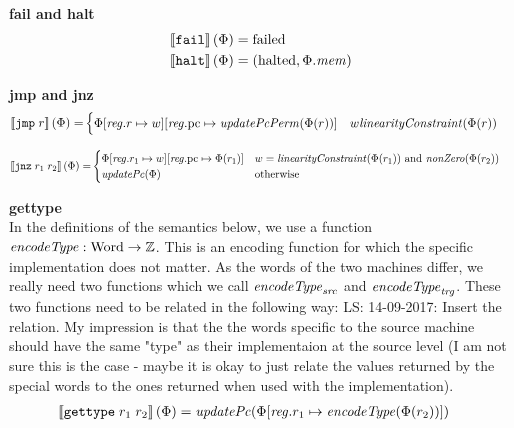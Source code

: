 \documentclass[a4paper]{article}
\newcommand\lau[1]{{\color{purple} \sf \footnotesize {LS: #1}}\\}
\newcommand{\sem}[1]{\left\llbracket #1 \right\rrbracket}
\newcommand{\tand}{\text{ and }}
\newcommand{\totherwise}{\text{otherwise }}
\newcommand{\targetcolor}[1]{\color{black}}
\newcommand{\trg}[1]{{\targetcolor{} #1}}
\newcommand{\zinstr}[1]{\texttt{#1}}
\newcommand{\oneinstr}[2]{
  \ifthenelse{\equal{#2}{}}
  {\zinstr{#1}}
  {\zinstr{#1} \; #2}
}
\newcommand{\twoinstr}[3]{
  \ifthenelse{\equal{#2#3}{}}
  {\zinstr{#1}}
  {\zinstr{#1} \; #2 \; #3}
}
\newcommand{\tfail}{\zinstr{\trg{fail}}}
\newcommand{\thalt}{\zinstr{\trg{halt}}}
\newcommand{\tjmp}[1]{\oneinstr{\trg{jmp}}{#1}}
\newcommand{\tjnz}[2]{\twoinstr{\trg{jnz}}{#1}{#2}}
\newcommand{\tisptr}[2]{\twoinstr{\trg{gettype}}{#1}{#2}}
\newcommand{\ints}{\mathbb{Z}}
\newcommand{\update}[2]{[#1 \mapsto #2]}
\newcommand{\updReg}[2]{\update{\reg.#1}{#2}}
\newcommand{\shareddom}[1]{\mathrm{#1}}
\newcommand{\Word}{\shareddom{Word}}
\newcommand{\failed}{\mathrm{failed}}
\newcommand{\halted}{\mathrm{halted}}
\newcommand{\var}[1]{\mathit{#1}}
\newcommand{\reg}{\var{reg}}
\newcommand{\mem}{\var{mem}}
\newcommand{\pcreg}{\mathrm{pc}}
\newcommand{\plainfun}[2]{
  \ifthenelse{\equal{#2}{}}
  {\mathit{#1}}
  {\mathit{#1}(#2)}
}
\newcommand{\encType}[1]{\plainfun{encodeType}{#1}}
\newcommand{\updPcAddr}[1]{\plainfun{updatePc}{#1}}
\newcommand{\updPcPerm}[1]{\plainfun{updatePcPerm}{#1}}
\newcommand{\linCons}[1]{\plainfun{linearityConstraint}{#1}}
\newcommand{\nonZero}[1]{\plainfun{nonZero}{#1}}
\begin{document}
\noindent\textbf{fail and halt}\\
\begin{align*}
  \sem{\tfail}(\Phi) = & \; \failed \\
  \sem{\thalt}(\Phi) = & \; (\halted, \Phi.\mem)
\end{align*}

\noindent\textbf{jmp and jnz}\\
\begin{align*}
  \sem{\tjmp{r}}(\Phi) = &  
                     \begin{cases}
                       \Phi\updReg{r}{w}\updReg{\pcreg}{\updPcPerm{\Phi(r)}} & w \linCons{\Phi(r)}
                     \end{cases}
\end{align*}

\begin{align*}
  \sem{\tjnz{r_1}{r_2}}(\Phi) = &       
                             \begin{cases}
                               \Phi\updReg{r_1}{w}\updReg{\pcreg}{\Phi(r_1)}
                                               & w = \linCons{\Phi(r_1)} \tand \nonZero{\Phi(r_2)}\\
                               \updPcAddr{\Phi} & \totherwise
                             \end{cases}
\end{align*}

\noindent\textbf{gettype}\\
In the definitions of the semantics below, we use a function $\encType{} : \Word \rightarrow \ints$. This is an encoding function for which the specific implementation does not matter. As the words of the two machines differ, we really need two functions which we call $\encType{}_{\var{src}}$ and $\encType{}_{\var{trg}}$. These two functions need to be related in the following way:
\lau{14-09-2017: Insert the relation. My impression is that the the words specific to the source machine should have the same "type" as their implementaion at the source level (I am not sure this is the case - maybe it is okay to just relate the values returned by the special words to the ones returned when used with the implementation). }
\begin{align*}
  \sem{\tisptr{r_1}{r_2}}(\Phi) = & \; \updPcAddr{}(\Phi\updReg{r_1}{\encType{\Phi(r_2)}})
\end{align*}
\end{document}
